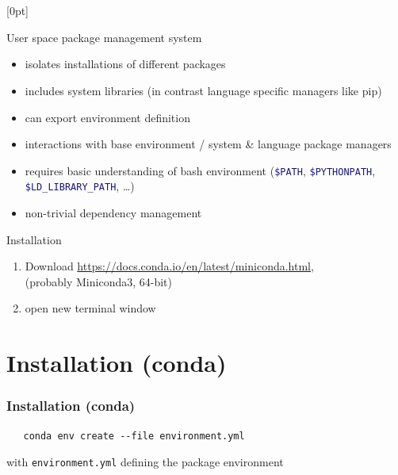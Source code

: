 \documentclass[
	t, %
	10pt, %
	aspectratio=1610, %
	ngerman,
	english,
	]{beamer}
\begin{document}
\section{\ttl}
\begin{frame}[fragile]
  \frametitle{\ttl}

  \begin{flushright}
  \raisebox{0pt}[0pt]{
  }
  \end{flushright}
  User space package management system
  \begin{itemize}
  \item[\pro] isolates installations of different packages
  \item[\pro] includes system libraries (in contrast language specific managers like pip)
  \item[\pro] can export environment definition
  \item[\con] interactions with base environment / system \& language package managers
  \item[\con] requires basic understanding of bash environment (\lstinline[language=bash]{$PATH}, \lstinline[language=bash]{$PYTHONPATH}, \lstinline[language=bash]{$LD_LIBRARY_PATH}, \ldots)
  \item[\con] non-trivial dependency management
  \end{itemize}

  \vspace*{.2cm}
  {\large Installation}
  \begin{enumerate}
  \item Download \url{https://docs.conda.io/en/latest/miniconda.html},\\\hspace*{1cm}(probably Miniconda3, 64-bit)
  \item open new terminal window
  \end{enumerate}

\end{frame}


\def\ttl{Installation (conda)}
\section{\ttl}
\begin{frame}[fragile]
  \frametitle{\ttl}

  \begin{lstlisting}
   conda env create --file environment.yml
  \end{lstlisting}
  with \lstinline{environment.yml} defining the package environment
  \hspace*{3.7cm}\parbox{.7\textwidth}{
  
  }
\end{frame}
\end{document}
